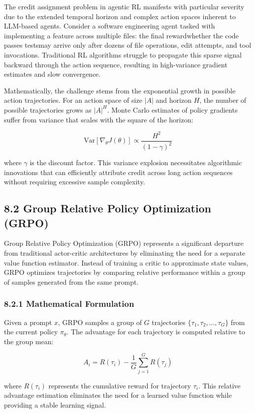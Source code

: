 The credit assignment problem in agentic RL manifests with particular severity due to the extended temporal horizon and complex action spaces inherent to LLM-based agents. Consider a software engineering agent tasked with implementing a feature across multiple files: the final rewardwhether the code passes testsmay arrive only after dozens of file operations, edit attempts, and tool invocations. Traditional RL algorithms struggle to propagate this sparse signal backward through the action sequence, resulting in high-variance gradient estimates and slow convergence.

Mathematically, the challenge stems from the exponential growth in possible action trajectories. For an action space of size $|A|$ and horizon $H$, the number of possible trajectories grows as $|A|^H$. Monte Carlo estimates of policy gradients suffer from variance that scales with the square of the horizon:

$$\text{Var}[\nabla_\theta J(\theta)] \propto \frac{H^2}{(1-\gamma)^2}$$

where $\gamma$ is the discount factor. This variance explosion necessitates algorithmic innovations that can efficiently attribute credit across long action sequences without requiring excessive sample complexity.

\subsection{8.2 Group Relative Policy Optimization (GRPO)}

Group Relative Policy Optimization (GRPO) represents a significant departure from traditional actor-critic architectures by eliminating the need for a separate value function estimator. Instead of training a critic to approximate state values, GRPO optimizes trajectories by comparing relative performance within a group of samples generated from the same prompt.

\subsubsection{8.2.1 Mathematical Formulation}

Given a prompt $x$, GRPO samples a group of $G$ trajectories $\{\tau_1, \tau_2, ..., \tau_G\}$ from the current policy $\pi_\theta$. The advantage for each trajectory is computed relative to the group mean:

$$A_i = R(\tau_i) - \frac{1}{G}\sum_{j=1}^{G} R(\tau_j)$$

where $R(\tau_i)$ represents the cumulative reward for trajectory $\tau_i$. This relative advantage estimation eliminates the need for a learned value function while providing a stable learning signal.

